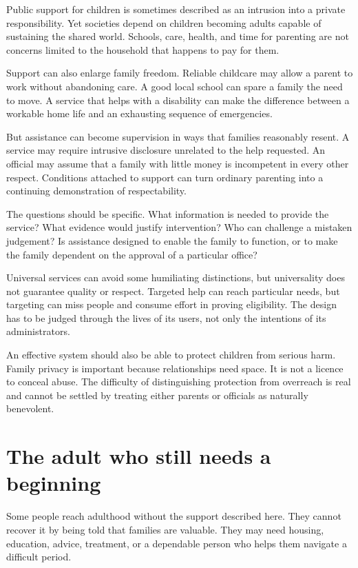 \documentclass[12pt,a4paper]{book}
\begin{document}
Public support for children is sometimes described as an intrusion into a private responsibility. Yet societies depend on children becoming adults capable of sustaining the shared world. Schools, care, health, and time for parenting are not concerns limited to the household that happens to pay for them.

Support can also enlarge family freedom. Reliable childcare may allow a parent to work without abandoning care. A good local school can spare a family the need to move. A service that helps with a disability can make the difference between a workable home life and an exhausting sequence of emergencies.

But assistance can become supervision in ways that families reasonably resent. A service may require intrusive disclosure unrelated to the help requested. An official may assume that a family with little money is incompetent in every other respect. Conditions attached to support can turn ordinary parenting into a continuing demonstration of respectability.

The questions should be specific. What information is needed to provide the service? What evidence would justify intervention? Who can challenge a mistaken judgement? Is assistance designed to enable the family to function, or to make the family dependent on the approval of a particular office?

Universal services can avoid some humiliating distinctions, but universality does not guarantee quality or respect. Targeted help can reach particular needs, but targeting can miss people and consume effort in proving eligibility. The design has to be judged through the lives of its users, not only the intentions of its administrators.

An effective system should also be able to protect children from serious harm. Family privacy is important because relationships need space. It is not a licence to conceal abuse. The difficulty of distinguishing protection from overreach is real and cannot be settled by treating either parents or officials as naturally benevolent.

\section*{The adult who still needs a beginning}

Some people reach adulthood without the support described here. They cannot recover it by being told that families are valuable. They may need housing, education, advice, treatment, or a dependable person who helps them navigate a difficult period.
\end{document}
